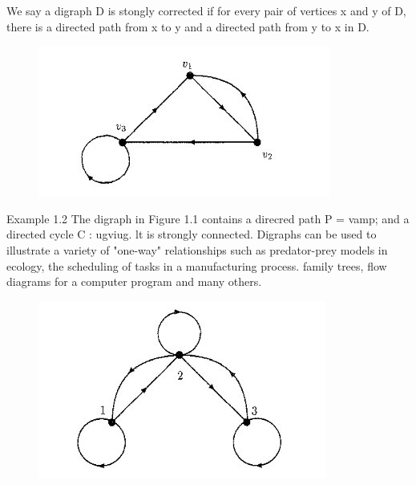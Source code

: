 \documentclass[]{article}
\begin{document}
We say a digraph D is stongly corrected if for every pair of vertices x and y of D, there is a directed path from x to y and a directed path from y to x in D.
\begin{figure}[h!]
\centering
\includegraphics[width=0.7\linewidth]{./Digraph1}
\caption{}
\label{fig:Digraph1}
\end{figure}
Example 1.2 The digraph in Figure 1.1 contains a direcred path P = vamp; and
a directed cycle C : ugviug. lt is strongly connected.
Digraphs can be used to illustrate a variety of "one-way" relationships such as
predator-prey models in ecology, the scheduling of tasks in a manufacturing process.
family trees, flow diagrams for a computer program and many others.
\begin{figure}
\centering
\includegraphics[width=0.7\linewidth]{./Digraph2}
\caption{}
\label{fig:Digraph2}
\end{figure}
\end{document}
